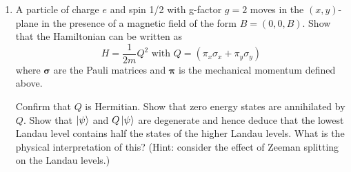 \documentclass[10pt,letterpaper]{article}
\begin{document}
\begin{enumerate}
\begin{gather*}
\end{gather*}
The Hamiltonian is given by $H = \frac{1}{2m}(\pi_{x}^{2} + \pi_{y}^{2} + \pi_{z}^{2})$, and $a^{\dagger}a$ is given by
\begin{gather*}
a^{\dagger}a = \frac{1}{2q\hbar\textbf{B}}(\pi_{x} - i\pi_{y})(\pi_{x} + i\pi_{y}) = \frac{1}{2q\hbar\textbf{B}}(\pi_{x}^{2} + \pi_{y}^{2} - \hbar q\textbf{B})
\end{gather*}
So the Hamiltonian could be rewritten as
\begin{gather*}
H = \frac{1}{2m}(2\hbar q\textbf{B}a^{\dagger}a + \hbar q\textbf{B} + \pi_{z}^{2}) = \frac{\hbar q\textbf{B}}{2m}(2a^{\dagger}a + 1) + \frac{\pi_{z}}{2m} = \frac{\hbar q\textbf{B}}{m}\left( a^{\dagger}a + \frac{1}{2} \right) + \frac{\pi_{z}^{2}}{2m}
\end{gather*} 
The energy spectrum is then solved where $a^{\dagger}a = n$, so $E_{n} = \frac{\hbar q\textbf{B}}{m}(n + \frac{1}{2}) + \frac{\pi_{z}^{2}}{2m}$
\color{black}

\item A particle of charge $e$ and spin 1/2 with g-factor $g = 2$ moves in the $(x, y)$-plane in the presence of a magnetic field of the form $B = (0, 0, B)$. Show that the Hamiltonian can be written as
$$H = \frac{1}{2m}Q^{2} \text{  with  } Q = (\pi_{x}\sigma_{x} + \pi_{y}\sigma_{y})$$
where $\boldsymbol{\sigma}$ are the Pauli matrices and $\boldsymbol{\pi}$ is the mechanical momentum defined above. 

Confirm that $Q$ is Hermitian. Show that zero energy states are annihilated by $Q$. Show that $\ket{\psi}$ and $Q\ket{\psi}$ are degenerate and hence deduce that the lowest Landau level contains half the states of the higher Landau levels. What is the physical interpretation of this? (Hint: consider the effect of Zeeman splitting on the Landau levels.)


\end{enumerate}
\end{document}

